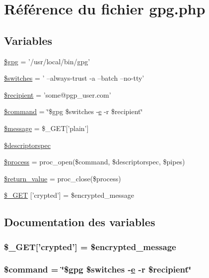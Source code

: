 \hypertarget{gpg_8php}{
\section{R\'{e}f\'{e}rence du fichier gpg.php}
\label{gpg_8php}
}
\subsection*{Variables}
\begin{CompactItemize}
\item 
\hyperlink{gpg_8php_a0}{\$gpg} = '/usr/local/bin/gpg'
\item 
\hyperlink{gpg_8php_a1}{\$switches} = ' --always-trust -a --batch --no-tty'
\item 
\hyperlink{gpg_8php_a2}{\$recipient} = 'some@pgp\_\-user.com'
\item 
\hyperlink{gpg_8php_a3}{\$command} = \char`\"{}\$gpg \$switches -\hyperlink{apa__zone_8php_a37}{e} -r \$recipient\char`\"{}
\item 
\hyperlink{gpg_8php_a4}{\$message} = \$\_\-GET\mbox{[}'plain'\mbox{]}
\item 
\hyperlink{gpg_8php_a5}{\$descriptorspec}
\item 
\hyperlink{gpg_8php_a6}{\$process} = proc\_\-open(\$command, \$descriptorspec, \$pipes)
\item 
\hyperlink{gpg_8php_a7}{\$return\_\-value} = proc\_\-close(\$process)
\item 
\hyperlink{gpg_8php_a8}{\$\_\-GET} \mbox{[}'crypted'\mbox{]} = \$encrypted\_\-message
\end{CompactItemize}


\subsection{Documentation des variables}
\hypertarget{gpg_8php_a8}{
\subsubsection[\$\_\-GET]{\setlength{\rightskip}{0pt plus 5cm}\$\_\-GET\mbox{[}'crypted'\mbox{]} = \$encrypted\_\-message}}
\label{gpg_8php_a8}


\hypertarget{gpg_8php_a3}{
\subsubsection[\$command]{\setlength{\rightskip}{0pt plus 5cm}\$command = \char`\"{}\$gpg \$switches -\hyperlink{apa__zone_8php_a37}{e} -r \$recipient\char`\"{}}}
\label{gpg_8php_a3}


